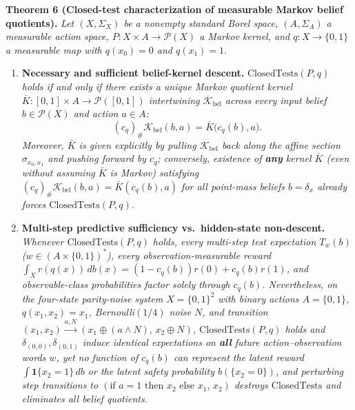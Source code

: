 \documentclass[11pt,a4paper]{article}
\newcounter{none}
\providecommand{\tightlist}{\setlength{\itemsep}{2pt}\setlength{\parskip}{0pt}}
\begin{document}
\textbf{Theorem 6 (Closed-test characterization of measurable Markov
belief quotients).} \emph{Let \((X, \Sigma_X)\) be a nonempty standard
Borel space, \((A, \Sigma_A)\) a measurable action space,
\(P: X \times A \to \mathcal{P}(X)\) a Markov kernel, and
\(q: X \to \{0,1\}\) a measurable map with \(q(x_0) = 0\) and
\(q(x_1) = 1\).}

\begin{enumerate}
\def\labelenumi{\arabic{enumi}.}
\tightlist
\item
  \textbf{Necessary and sufficient belief-kernel descent.}
  \emph{\(\mathrm{ClosedTests}(P, q)\) holds if and only if there exists
  a unique Markov quotient kernel
  \(\bar{K}: [0,1] \times A \to \mathcal{P}([0,1])\) intertwining
  \(\mathcal{K}_{\mathrm{bel}}\) across every input belief
  \(b \in \mathcal{P}(X)\) and action \(a \in A\):}
  \[(c_q)_\# \mathcal{K}_{\mathrm{bel}}(b, a) = \bar{K}\bigl(c_q(b), a\bigr).\]
  \emph{Moreover, \(\bar{K}\) is given explicitly by pulling
  \(\mathcal{K}_{\mathrm{bel}}\) back along the affine section
  \(\sigma_{x_0, x_1}\) and pushing forward by \(c_q\); conversely,
  existence of \textbf{any} kernel \(\bar{K}\) (even without assuming
  \(\bar{K}\) is Markov) satisfying
  \((c_q)_\# \mathcal{K}_{\mathrm{bel}}(b,a) = \bar{K}(c_q(b), a)\) for
  all point-mass beliefs \(b = \delta_x\) already forces
  \(\mathrm{ClosedTests}(P, q)\).}
\item
  \textbf{Multi-step predictive sufficiency vs.~hidden-state
  non-descent.} \emph{Whenever \(\mathrm{ClosedTests}(P, q)\) holds,
  every multi-step test expectation \(T_w(b)\)
  (\(w \in (A \times \{0,1\})^*\)), every observation-measurable reward
  \(\int_X r(q(x))\, db(x) = (1 - c_q(b))r(0) + c_q(b)r(1)\), and
  observable-class probabilities factor solely through \(c_q(b)\).
  Nevertheless, on the four-state parity-noise system \(X = \{0,1\}^2\)
  with binary actions \(A = \{0,1\}\), \(q(x_1, x_2) = x_1\),
  Bernoulli\((1/4)\) noise \(N\), and transition
  \((x_1, x_2) \xrightarrow{a, N} (x_1 \oplus (a \land N),\, x_2 \oplus N)\),
  \(\mathrm{ClosedTests}(P, q)\) holds and
  \(\delta_{(0,0)}, \delta_{(0,1)}\) induce identical expectations on
  \textbf{all} future action--observation words \(w\), yet no function
  of \(c_q(b)\) can represent the latent reward
  \(\int \mathbf{1}\{x_2 = 1\}\, db\) or the latent safety probability
  \(b(\{x_2 = 0\})\), and perturbing step transitions to
  \((\text{if } a = 1 \text{ then } x_2 \text{ else } x_1,\, x_2)\)
  destroys \(\mathrm{ClosedTests}\) and eliminates all belief
  quotients.}
\end{enumerate}
\end{document}

